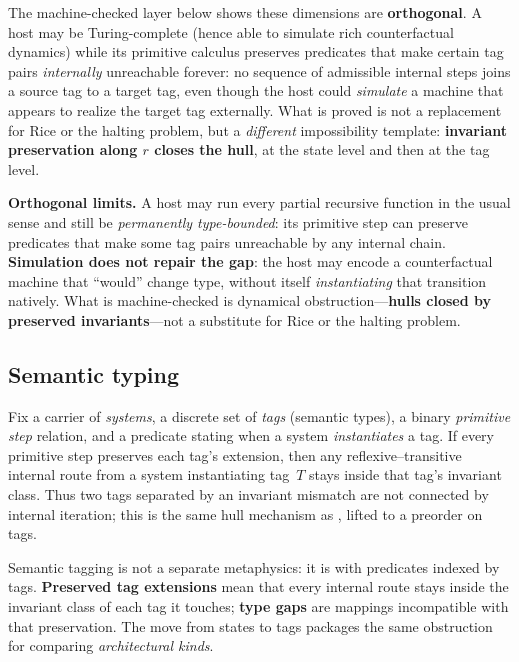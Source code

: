 \documentclass[11pt]{article}
\theoremstyle{plain}
\theoremstyle{definition}
\theoremstyle{remark}
\begin{document}
\medskip
The machine-checked layer below shows these dimensions are \textbf{orthogonal}.  A host may
be Turing-complete (hence able to simulate rich counterfactual dynamics) while its
primitive calculus preserves predicates that make certain tag pairs \emph{internally}
unreachable forever: no sequence of admissible internal steps joins a source tag to a
target tag, even though the host could \emph{simulate} a machine that appears to realize
the target tag externally.  What is proved is not a replacement for Rice or the halting
problem, but a \emph{different} impossibility template: \textbf{invariant preservation
along $r$ closes the hull}, at the state level and then at the tag level.

\begin{keybox}[title={Turing-complete $\neq$ semantic-type complete}]
\textbf{Orthogonal limits.}  A host may run every partial recursive function in the usual
sense and still be \emph{permanently type-bounded}: its primitive step can preserve
predicates that make some tag pairs unreachable by any internal chain.  \textbf{Simulation
does not repair the gap}: the host may encode a counterfactual machine that
``would'' change type, without itself \emph{instantiating} that transition natively.  What is
machine-checked is dynamical obstruction---\textbf{hulls closed by preserved
invariants}---not a substitute for Rice or the halting problem.
\end{keybox}

\subsection*{Semantic typing}

Fix a carrier of \emph{systems}, a discrete set of \emph{tags} (semantic types), a binary
\emph{primitive step} relation, and a predicate stating when a system \emph{instantiates}
a tag.  If every primitive step preserves each tag's extension, then any reflexive--transitive
internal route from a system instantiating tag~$T$ stays inside that tag's invariant class.
Thus two tags separated by an invariant mismatch are not connected by internal iteration;
this is the same hull mechanism as , lifted to a preorder on tags.

\begin{keybox}[title={Tags inherit the fold boundary}]
Semantic tagging is not a separate metaphysics: it is  with
predicates indexed by tags.  \textbf{Preserved tag extensions} mean that every internal
route stays inside the invariant class of each tag it touches; \textbf{type gaps} are
mappings incompatible with that preservation.  The move from states to tags packages the
same obstruction for comparing \emph{architectural kinds}.
\end{keybox}
\end{document}
